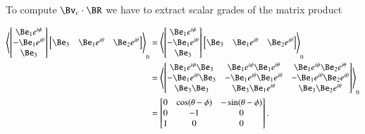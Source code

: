 To compute $\Bv_c \cdot \BR$ we have to extract scalar grades of the matrix product

\begin{align*}
\gpgradezero{
\begin{bmatrix}
\Be_1 e^{i\phi} \\
- \Be_1 e^{i\theta} \\
 \Be_3
\end{bmatrix}
\begin{bmatrix}
\Be_3 & \Be_1 e^{i \theta} & \Be_2 e^{i\theta}
\end{bmatrix}
}
&=
\gpgradezero{
\begin{bmatrix}
\Be_1 e^{i\phi} \\
- \Be_1 e^{i\theta} \\
 \Be_3
\end{bmatrix}
\begin{bmatrix}
\Be_3 & \Be_1 e^{i \theta} & \Be_2 e^{i\theta}
\end{bmatrix}
} \\
&=
\gpgradezero{
\begin{bmatrix}
\Be_1 e^{i\phi} \Be_3 & \Be_1 e^{i\phi} \Be_1 e^{i \theta}  & \Be_1 e^{i\phi} \Be_2 e^{i\theta} \\
- \Be_1 e^{i\theta} \Be_3 & - \Be_1 e^{i\theta} \Be_1 e^{i \theta}  & - \Be_1 e^{i\theta} \Be_2 e^{i\theta} \\
 \Be_3 \Be_3 & \Be_3 \Be_1 e^{i \theta}  & \Be_3 \Be_2 e^{i\theta} \\
\end{bmatrix}
} \\
&= 
\begin{bmatrix}
0 & \cos(\theta-\phi)  & - \sin(\theta - \phi) \\
0 & - 1  & 0 \\
1 & 0 & 0 \\
\end{bmatrix}.
\end{align*}

